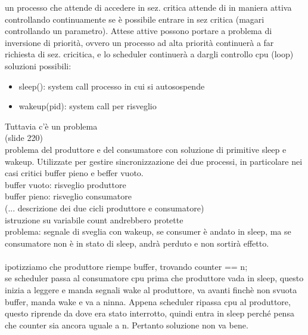 \documentclass{article}
\begin{document}
un processo che attende di accedere in sez. critica attende di in maniera attiva controllando continuamente se è possibile entrare in sez critica (magari controllando un parametro). Attese attive possono portare a problema di inversione di priorità, ovvero un processo ad alta priorità continuerà a far richiesta di sez. cricitica, e lo scheduler continuerà a dargli controllo cpu (loop)
\\
soluzioni possibili:
\begin{itemize}
    \item sleep(): system call processo in cui si autosospende
    \item wakeup(pid): system call per risveglio
\end{itemize}
Tuttavia c'è un problema\\
(slide 220)\\
problema del produttore e del consumatore con soluzione di primitive sleep e wakeup. Utilizzate per gestire sincronizzazione dei due processi, in particolare nei casi critici buffer pieno e beffer vuoto.\\
buffer vuoto: risveglio produttore\\
buffer pieno: risveglio consumatore\\
(... descrizione dei due cicli produttore e consumatore)\\
istruzione su variabile count andrebbero protette\\
problema: segnale di sveglia con wakeup, se consumer è andato in sleep, ma se consumatore non è in stato di sleep, andrà perduto e non sortirà effetto.\\
\\
ipotizziamo che produttore riempe buffer, trovando counter == n;\\
se scheduler passa al consumatore cpu prima che produttore vada in sleep, questo inizia a leggere e manda segnali wake al produttore, va avanti finchè non svuota buffer, manda wake e va a ninna. Appena scheduler ripassa cpu al produttore, questo riprende da dove era stato interrotto, quindi entra in sleep perché pensa che counter sia ancora uguale a n. Pertanto soluzione non va bene.
\end{document}
